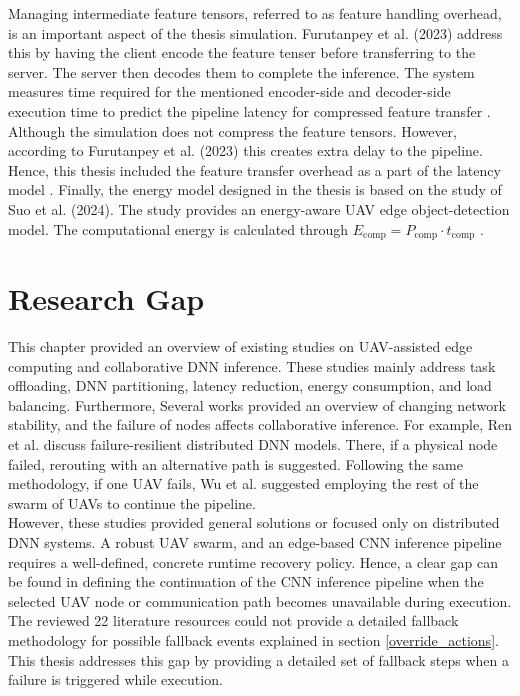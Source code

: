 Managing intermediate feature tensors, referred to as feature handling overhead, is an important aspect of the thesis simulation. Furutanpey et al. (2023) address this by having the client encode the feature tenser before transferring to the server. The server then decodes them to complete the inference. The system measures time required for the mentioned encoder-side and decoder-side execution time to predict the pipeline latency for compressed feature transfer \cite{FrankenSplit2023Furutanpey}.\\

Although the simulation does not compress the feature tensors. However, according to Furutanpey et al. (2023) this creates extra delay to the pipeline. Hence, this thesis included the feature transfer overhead as a part of the latency model \cite{FrankenSplit2023Furutanpey}. 
Finally, the energy model designed in the thesis is based on the study of Suo et al. (2024). The study provides an energy-aware UAV edge object-detection model. The computational energy is calculated through \(E_{\text{comp}} = P_{\text{comp}} \cdot t_{\text{comp}}\) \cite{E3UAV2024Suo}.





\section{Research Gap}
\label{Research_Gap}

This chapter provided an overview of existing studies on UAV-assisted edge computing and collaborative DNN inference. These studies mainly address task offloading, DNN partitioning, latency reduction, energy consumption, and load balancing. Furthermore, 
Several works provided an overview of changing network stability, and the failure of nodes affects collaborative inference. For example, Ren et al. discuss failure-resilient distributed DNN models. There, if a physical node failed, rerouting with an alternative path is suggested. Following the same methodology, if one UAV fails, Wu et al. suggested employing the rest of the swarm of UAVs to continue the pipeline.\\

However, these studies provided general solutions or focused only on distributed DNN systems. A robust UAV swarm, and an edge-based CNN inference pipeline requires a well-defined, concrete runtime recovery policy. Hence, a clear gap can be found in defining the continuation of the CNN inference pipeline when the selected UAV node or communication path becomes unavailable during execution. The reviewed 22 literature resources could not provide a detailed fallback methodology for possible fallback events explained in section \ref{override_actions}. This thesis addresses this gap by providing a detailed set of fallback steps when a failure is triggered while execution.